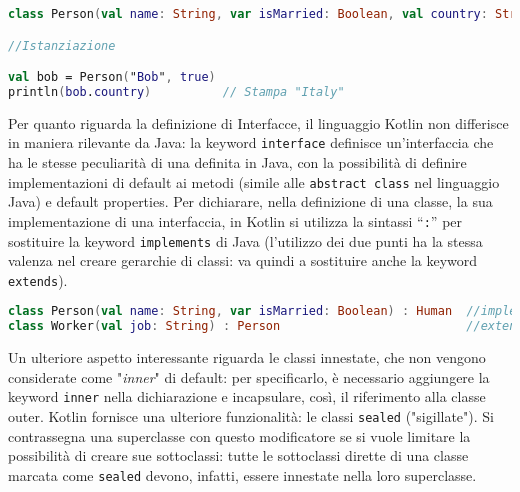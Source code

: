\begin{lstlisting}[caption={Proprietà predefinite}, captionpos=b, label={lst:exampleDefProperties}, language=Kotlin]
class Person(val name: String, var isMarried: Boolean, val country: String = "Italy")

//Istanziazione

val bob = Person("Bob", true)
println(bob.country)          // Stampa "Italy"
\end{lstlisting}

Per quanto riguarda la definizione di Interfacce, il linguaggio Kotlin non differisce in maniera rilevante da Java: la keyword \texttt{interface} definisce un’interfaccia che ha le stesse peculiarità di una definita in Java, con la possibilità di definire implementazioni di default ai metodi (simile alle \texttt{abstract class} nel linguaggio Java) e default properties. Per dichiarare, nella definizione di una classe, la sua implementazione di una interfaccia, in Kotlin si utilizza la sintassi “\texttt{:}” per sostituire la keyword \texttt{implements} di Java (l'utilizzo dei due punti ha la stessa valenza nel creare gerarchie di classi: va quindi a sostituire anche la keyword \texttt{extends}).\\

\begin{lstlisting}[caption={Utilizzo della notazione "\texttt{:}"}, captionpos=b, label={lst:exampleEreditarietà}, language=Kotlin]
class Person(val name: String, var isMarried: Boolean) : Human  //implements
class Worker(val job: String) : Person                          //extends
\end{lstlisting}

Un ulteriore aspetto interessante riguarda le classi innestate, che non vengono considerate come "{\em inner}" di default: per specificarlo, è necessario aggiungere la keyword \texttt{inner} nella dichiarazione e incapsulare, così, il riferimento alla classe outer. Kotlin fornisce una ulteriore funzionalità: le classi \texttt{sealed} ("sigillate"). Si contrassegna una superclasse con questo modificatore se si vuole limitare la possibilità di creare sue sottoclassi: tutte le sottoclassi dirette di una classe marcata come \texttt{sealed} devono, infatti, essere innestate nella loro superclasse.\\

